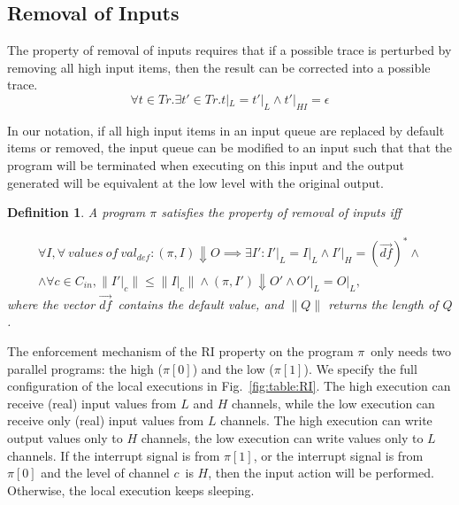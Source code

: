 \documentclass[10pt,a4paper,oneside]{article}
\newtheorem{definition}{Definition}[section]
\def\execution#1#2#3{\ensuremath{(#1, #2)\Downarrow#3}}
\def\loweq#1#2{\ensuremath{\restrict{#1}{L} = \restrict{#2}{L}}}
\def\restrict#1#2{\ensuremath{{#1}|_{#2}}}
\def\chnl{\ensuremath{c}}
\def\Cin{\ensuremath{C_{in}}}
\def\defVal{\ensuremath{val_{def}}}
\def\defvec{\ensuremath{\vec{df}}}
\def\Prog{\ensuremath{\pi}}
\def\Progl#1{\ensuremath{\Prog[#1]}}
\def\length#1{\ensuremath{\parallel#1\parallel}}
\begin{document}
\subsection{Removal of Inputs}\label{sec:em:RI}

The property of removal of inputs \cite{MANT-00-CSF} requires that if a possible trace is perturbed by removing all high input items, then the result can be corrected into a possible trace.
\begin{equation*} \label{equa:RI:Mantel}
\forall t \in Tr. \exists t' \in Tr. t|_L = t'|_L \wedge t'|_{HI} = \epsilon
\end{equation*}

In our notation, if all high input items in an input queue are replaced by default items or removed, the input queue can be modified to an input such that that the program will be terminated when executing on this input and the output generated will be equivalent at the low level with the original output.

\begin{definition}\label{def:RI}
A program $\Prog$ satisfies the property of \emph{removal of inputs} iff

\begin{multline*}
 \forall I, \forall\ values\ of\ \defVal: \execution{\Prog}{I}{O} \implies  \exists I': \loweq{I'}{I} \wedge I'|_H = (\defvec)^*  \wedge \\
    \wedge \forall \chnl \in \Cin, \length{I'|_c} \leq \length{I|_c} \wedge \execution{\Prog}{I'}{O'} \wedge \loweq{O'}{O},
\end{multline*}where the vector \defvec\ contains the default value, and \length{Q} returns the length of $Q$.
\end{definition}



The enforcement mechanism of the RI property on the program \Prog\ only needs two parallel programs: the high ($\Prog[0]$) and the low ($\Prog[1]$). We specify the full configuration of the local executions in Fig.~\ref{fig:table:RI}. The high execution can receive (real) input values from $L$ and $H$ channels, while the low execution can receive only (real) input values from $L$ channels. The high execution can write output values only to $H$ channels, the low execution can write values only to $L$ channels. If the interrupt signal is from \Progl{1}, or the interrupt signal is from \Progl{0} and the level of channel \chnl\ is $H$, then the input action will be performed. Otherwise, the local execution keeps sleeping.
\end{document}
